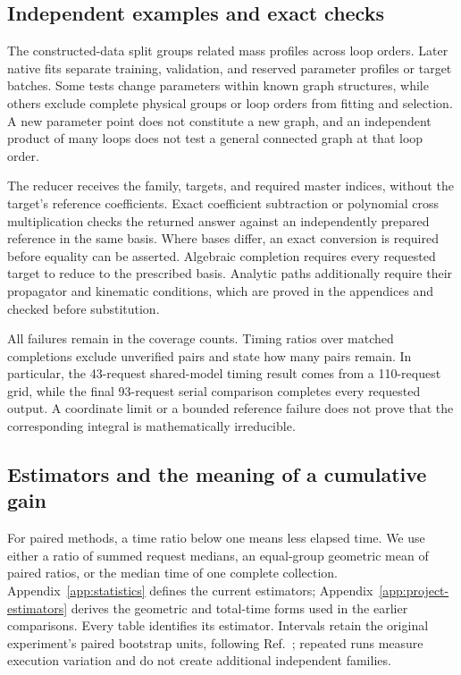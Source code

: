 \subsection{Independent examples and exact checks}
The constructed-data split groups related mass profiles across loop orders. Later native fits separate training, validation, and reserved parameter profiles or target batches. Some tests change parameters within known graph structures, while others exclude complete physical groups or loop orders from fitting and selection. A new parameter point does not constitute a new graph, and an independent product of many loops does not test a general connected graph at that loop order.

The reducer receives the family, targets, and required master indices, without the target's reference coefficients. Exact coefficient subtraction or polynomial cross multiplication checks the returned answer against an independently prepared reference in the same basis. Where bases differ, an exact conversion is required before equality can be asserted. Algebraic completion requires every requested target to reduce to the prescribed basis. Analytic paths additionally require their propagator and kinematic conditions, which are proved in the appendices and checked before substitution.

All failures remain in the coverage counts. Timing ratios over matched completions exclude unverified pairs and state how many pairs remain. In particular, the 43-request shared-model timing result comes from a 110-request grid, while the final 93-request serial comparison completes every requested output. A coordinate limit or a bounded reference failure does not prove that the corresponding integral is mathematically irreducible.

\subsection{Estimators and the meaning of a cumulative gain}
For paired methods, a time ratio below one means less elapsed time. We use either a ratio of summed request medians, an equal-group geometric mean of paired ratios, or the median time of one complete collection. Appendix~\ref{app:statistics} defines the current estimators; Appendix~\ref{app:project-estimators} derives the geometric and total-time forms used in the earlier comparisons. Every table identifies its estimator. Intervals retain the original experiment's paired bootstrap units, following Ref.~\cite{Efron1979}; repeated runs measure execution variation and do not create additional independent families.

